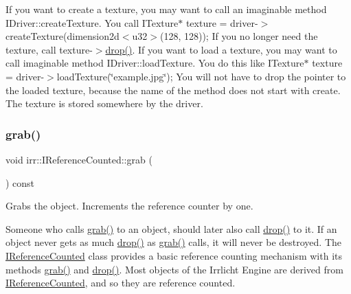 If you want to create a texture, you may want to call an imaginable method I\+Driver\+::create\+Texture. You call I\+Texture$\ast$ texture = driver-\/$>$create\+Texture(dimension2d$<$u32$>$(128, 128)); If you no longer need the texture, call texture-\/$>$\hyperlink{classirr_1_1IReferenceCounted_a03856a09355b89d178090c4a5f738543}{drop()}. If you want to load a texture, you may want to call imaginable method I\+Driver\+::load\+Texture. You do this like I\+Texture$\ast$ texture = driver-\/$>$load\+Texture(\char`\"{}example.\+jpg\char`\"{}); You will not have to drop the pointer to the loaded texture, because the name of the method does not start with \textquotesingle{}create\textquotesingle{}. The texture is stored somewhere by the driver. \mbox{\label{classirr_1_1IReferenceCounted_a396f9cdbe311ada278626477b3c6f0f5}} 
\subsubsection{\texorpdfstring{grab()}{grab()}\hspace{0.1cm}{\footnotesize\ttfamily [2/2]}}
{\footnotesize\ttfamily void irr\+::\+I\+Reference\+Counted\+::grab (\begin{DoxyParamCaption}{ }\end{DoxyParamCaption}) const\hspace{0.3cm}{\ttfamily [inline]}}



Grabs the object. Increments the reference counter by one. 

Someone who calls \hyperlink{classirr_1_1IReferenceCounted_a396f9cdbe311ada278626477b3c6f0f5}{grab()} to an object, should later also call \hyperlink{classirr_1_1IReferenceCounted_a03856a09355b89d178090c4a5f738543}{drop()} to it. If an object never gets as much \hyperlink{classirr_1_1IReferenceCounted_a03856a09355b89d178090c4a5f738543}{drop()} as \hyperlink{classirr_1_1IReferenceCounted_a396f9cdbe311ada278626477b3c6f0f5}{grab()} calls, it will never be destroyed. The \hyperlink{classirr_1_1IReferenceCounted}{I\+Reference\+Counted} class provides a basic reference counting mechanism with its methods \hyperlink{classirr_1_1IReferenceCounted_a396f9cdbe311ada278626477b3c6f0f5}{grab()} and \hyperlink{classirr_1_1IReferenceCounted_a03856a09355b89d178090c4a5f738543}{drop()}. Most objects of the Irrlicht Engine are derived from \hyperlink{classirr_1_1IReferenceCounted}{I\+Reference\+Counted}, and so they are reference counted.

